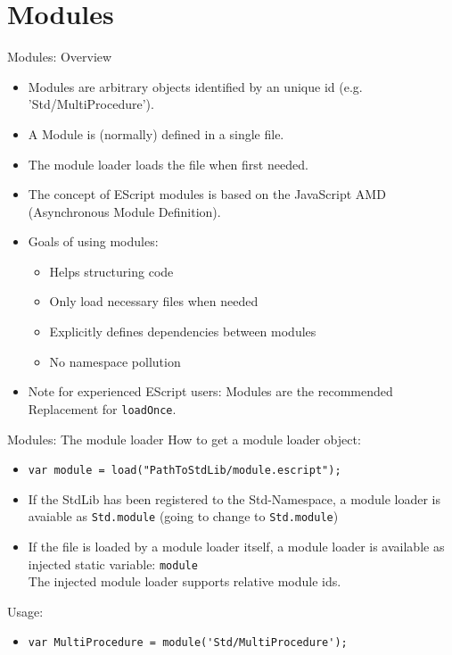 \documentclass[ucs,9pt]{beamer}
\begin{document}
\section{Modules}

\begin{frame}[fragile]{Modules: Overview}
\begin{itemize}
\item Modules are arbitrary objects identified by an unique id (e.g. 'Std/MultiProcedure').
\item A Module is (normally) defined in a single file.
\item The module loader loads the file when first needed.
\item The concept of EScript modules is based on the JavaScript AMD (Asynchronous Module Definition).
\item Goals of using modules:
\begin{itemize}
\item Helps structuring code
\item Only load necessary files when needed
\item Explicitly defines dependencies between modules 
\item No namespace pollution 
\end{itemize}
\item Note for experienced EScript users: Modules are the recommended Replacement for  \lstinline!loadOnce!.
\end{itemize}
\end{frame}


\begin{frame}[fragile]{Modules: The module loader}
How to get a module loader object:
\begin{itemize}
\item \lstinline!var module = load("PathToStdLib/module.escript"); !
\item If the StdLib has been registered to the Std-Namespace, a module loader is avaiable as \lstinline!Std.module! (going to change to \lstinline!Std.module!)
\item If the file is loaded by a module loader itself, a module loader is available as injected static variable: \lstinline!module!\\
The injected module loader supports relative module ids.
\end{itemize}
Usage:
\begin{itemize}
\item \lstinline!var MultiProcedure = module('Std/MultiProcedure');!
\end{itemize}
\end{frame}
\end{document}
